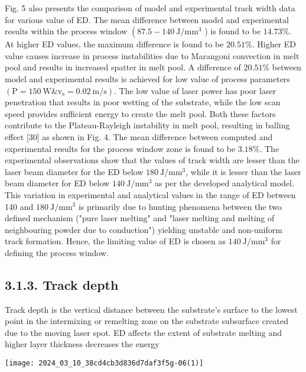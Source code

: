 \documentclass[10pt]{article}
\begin{document}
Fig. 5 also presents the comparison of model and experimental track width data for various value of ED. The mean difference between model and experimental results within the process window $\left(87.5-140 \mathrm{~J} / \mathrm{mm}^{3}\right.$ ) is found to be $14.73 \%$. At higher ED values, the maximum difference is found to be $20.51 \%$. Higher ED value causes increase in process instabilities due to Marangoni convection in melt pool and results in increased spatter in melt pool. A difference of $20.51 \%$ between model and experimental results is achieved for low value of process parameters $\left(\mathrm{P}=150 \mathrm{~W} \& \mathrm{v}_{\mathrm{s}}=0.02 \mathrm{~m} / \mathrm{s}\right)$. The low value of laser power has poor laser penetration that results in poor wetting of the substrate, while the low scan speed provides sufficient energy to create the melt pool. Both these factors contribute to the Plateau-Rayleigh instability in melt pool, resulting in balling effect [30] as shown in Fig. 4. The mean difference between computed and experimental results for the process window zone is found to be $3.18 \%$. The experimental observations show that the values of track width are lesser than the laser beam diameter for the ED below $180 \mathrm{~J} / \mathrm{mm}^{3}$, while it is lesser than the laser beam diameter for ED below $140 \mathrm{~J} / \mathrm{mm}^{3}$ as per the developed analytical model. This variation in experimental and analytical values in the range of ED between 140 and $180 \mathrm{~J} / \mathrm{mm}^{3}$ is primarily due to hunting phenomena between the two defined mechanism ("pure laser melting" and "laser melting and melting of neighbouring powder due to conduction") yielding unstable and non-uniform track formation. Hence, the limiting value of ED is chosen as $140 \mathrm{~J} / \mathrm{mm}^{3}$ for defining the process window.

\subsection*{3.1.3. Track depth}
Track depth is the vertical distance between the substrate's surface to the lowest point in the intermixing or remelting zone on the substrate subsurface created due to the moving laser spot. ED affects the extent of substrate melting and higher layer thickness decreases the energy

\begin{center}
\texttt{[image: 2024\_03\_10\_38cd4cb3d836d7daf3f5g-06(1)]}
\end{center}
\end{document}
